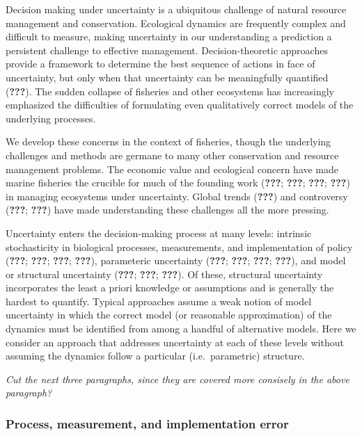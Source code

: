 \documentclass[author-year, review]{elsarticle} %
\begin{document}
Decision making under uncertainty is a ubiquitous challenge of natural
resource management and conservation. Ecological dynamics are frequently
complex and difficult to measure, making uncertainty in our
understanding a prediction a persistent challenge to effective
management. Decision-theoretic approaches provide a framework to
determine the best sequence of actions in face of uncertainty, but only
when that uncertainty can be meaningfully quantified ({\textbf{???}}).
The sudden collapse of fisheries and other ecosystems has increasingly
emphasized the difficulties of formulating even qualitatively correct
models of the underlying processes.

We develop these concerns in the context of fisheries, though the
underlying challenges and methods are germane to many other conservation
and resource management problems. The economic value and ecological
concern have made marine fisheries the crucible for much of the founding
work ({\textbf{???}}; {\textbf{???}}; {\textbf{???}}; {\textbf{???}}) in
managing ecosystems under uncertainty. Global trends ({\textbf{???}})
and controversy ({\textbf{???}}; {\textbf{???}}) have made understanding
these challenges all the more pressing.

Uncertainty enters the decision-making process at many levels: intrinsic
stochasticity in biological processes, measurements, and implementation
of policy ({\textbf{???}}; {\textbf{???}}; {\textbf{???}};
{\textbf{???}}), parameteric uncertainty ({\textbf{???}};
{\textbf{???}}; {\textbf{???}}; {\textbf{???}}), and model or structural
uncertainty ({\textbf{???}}; {\textbf{???}}; {\textbf{???}}). Of these,
structural uncertainty incorporates the least a priori knowledge or
assumptions and is generally the hardest to quantify. Typical approaches
assume a weak notion of model uncertainty in which the correct model (or
reasonable approximation) of the dynamics must be identified from among
a handful of alternative models. Here we consider an approach that
addresses uncertainty at each of these levels without assuming the
dynamics follow a particular (i.e.~parametric) structure.

\emph{Cut the next three paragraphs, since they are covered more
consisely in the above paragraph?}

\subsubsection{Process, measurement, and implementation
error}\label{process-measurement-and-implementation-error}
\end{document}
